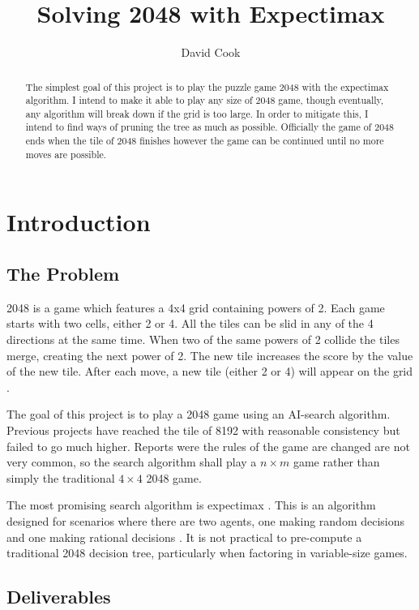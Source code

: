 \documentclass{article}
\title{Solving 2048 with Expectimax}
\author{David Cook}
\begin{document}
\maketitle

\tableofcontents
\newpage
\begin{abstract}
The simplest goal of this project is to play the puzzle game 2048 with the expectimax algorithm. I intend to make it able to play any size of 2048 game, though eventually, any algorithm will break down if the grid is too large. In order to mitigate this, I intend to find ways of pruning the tree as much as possible. Officially the game of 2048 ends when the tile of 2048 finishes however the game can be continued until no more moves are possible.
\end{abstract}
\section{Introduction}
\label{sec:intro}
\subsection{The Problem}
\label{subsec:problem}
2048 is a game which features a 4x4 grid containing powers of 2. Each game starts with two cells, either 2 or 4.
All the tiles can be slid in any of the 4 directions at the same time. When two of the same powers of 2 collide the tiles merge, creating the next power of 2. The new tile increases the score by the value of the new tile. After each move, a new tile (either 2 or 4) will appear on the grid \cite{game2048}.

The goal of this project is to play a 2048 game using an AI-search algorithm. Previous projects have reached the tile of 8192 with reasonable consistency \cite{expectimax2048} but failed to go much higher. Reports were the rules of the game are changed are not very common, so the search algorithm shall play a $n \times m$ game rather than simply the traditional $4 \times 4$ 2048 game.

The most promising search algorithm is expectimax \cite{aiplays2048}. This is an algorithm designed for scenarios where there are two agents, one making random decisions and one making rational decisions \cite[~p.200]{russell2010artificial}. It is not practical to pre-compute a traditional 2048 decision tree, particularly when factoring in variable-size games.

\subsection{Deliverables}
\label{subsec:deliverable}
\end{document}
